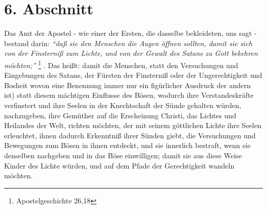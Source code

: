 \section{6. Abschnitt}  \label{kap2_ab6}

Das Amt der Apostel - wie einer der Ersten, die dasselbe bekleideten, uns sagt -
bestand darin:
\textit{"`daß sie den Menschen die Augen öffnen sollten, damit sie
sich von der Finsterniß zum Lichte, und von der Gewalt des Satans zu Gott
bekehren
möchten;"'}
\footnote{Apostelgeschichte 26,18}
.
Das heißt: damit die Menschen, statt den 
Versuchungen und Eingebungen des Satans,  der Fürsten der
Finsterniß oder der Ungerechtigkeit und Bosheit  wovon eine Benennung immer nur
ein figürlicher Ausdruck der andern ist) statt diesem mächtigen Einflusse des
Bösen, wodurch ihre Verstandeskräfte verfinstert und ihre Seelen in der
Knechtschaft der Sünde gehalten würden, nachzugeben, ihre Gemüther auf die
Erscheinung Christi, das Lichtes und Heilandes der Welt, richten möchten, der
mit seinem göttlichen Lichte ihre Seelen erleuchtet, ihnen dadurch Erkenntniß
ihrer Sünden giebt, die Versuchungen und Bewegungen zum Bösen in ihnen entdeckt,
und sie innerlich bestraft, wenn sie denselben nachgeben und in das Böse
einwilligen; damit sie aus diese Weise Kinder des Lichte würden, und auf dem
Pfade der Gerechtigkeit wandeln möchten.

\medskip 

